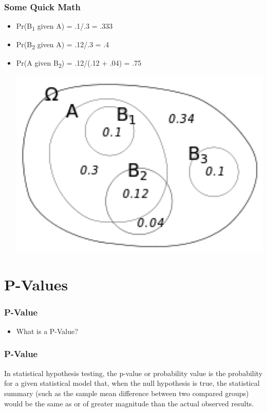 \documentclass[14pt,handout]{beamer}
\begin{document}
\begin{frame}
\frametitle{Some Quick Math}
\begin{itemize}
	\item[] Pr(B\textsubscript{1} given A) = .1/.3 = .333
	\item[] Pr(B\textsubscript{2} given A) = .12/.3 = .4
	\item[] Pr(A given B\textsubscript{2}) = .12/(.12 + .04) = .75
	\begin{center}
	\includegraphics[width=.7\textwidth]{images_20171128_condtionalprobs.png}
	\end{center}
\end{itemize}
\end{frame}


\section{P-Values}

\begin{frame}
\frametitle{P-Value}
\begin{itemize}
	\item<+-> What is a P-Value?
\end{itemize}
\end{frame}

\begin{frame}
\frametitle{P-Value}
In statistical hypothesis testing, the p-value or probability value is the probability for a given statistical model that, when the null hypothesis is true, the statistical summary (such as the sample mean difference between two compared groups) would be the same as or of greater magnitude than the actual observed results.
\end{frame}
\end{document}
